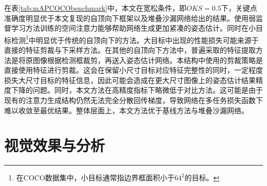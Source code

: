 在表\ref{tab:mAPCOCObenchmark}中，本文在宽松条件，即$OKS=0.5$下，关键点准确度明显优于本文复现的自顶向下框架以及堆叠沙漏网络给出的结果。使用弱监督学习方法训练的空间注意力能够帮助网络生成更加紧凑的姿态估计。同时在小目标检测\footnote{在COCO数据集中，小目标通常指边界框面积小于$64^2$的目标。}中明显优于传统的自顶向下的方法。大目标中出现的性能损失可能来源于直接的特征剪裁与下采样方法。在其他的自顶向下方法中，普遍采取的特征提取方法是将原图像根据检测框裁剪，再送入姿态估计网络。本结构中使用的剪裁策略是直接使用特征进行剪裁。这会在保留小尺寸目标对应特征完整性的同时，一定程度损失大尺寸目标的特征信息，因此可能会造成在更大尺寸图像上的姿态估计结果精度下降的问题。同时，本文方法在高精度指标下略微低于对比方法。这可能是由于现有的注意力生成结构仍然无法完全分散回传梯度，导致网络在多任务损失函数下难以收敛至最优结果。整体层面上，本文方法优于基线方法与堆叠沙漏网络。


\section{视觉效果与分析}
\label{sec:demo}

